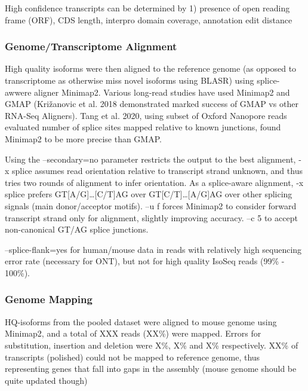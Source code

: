High confidence transcripts can be determined by 1) presence of open reading frame (ORF), CDS length, interpro domain coverage, annotation edit distance 

\subsubsection{Genome/Transcriptome Alignment} 
High quality isoforms were then aligned to the reference genome (as opposed to transcriptome as otherwise miss novel isoforms using BLASR) using splice-awwere aligner Minimap2. Various long-read studies have used Minimap2 and GMAP (Križanovic et al. 2018 demonstrated marked success of GMAP vs other RNA-Seq Aligners). Tang et al. 2020, using subset of Oxford Nanopore reads evaluated number of splice sites mapped relative to known junctions, found Minimap2 to be more precise than GMAP. 

Using the –secondary=no parameter restricts the output to the best alignment, -x splice assumes read orientation relative to transcript strand unknown, and thus tries two rounds of alignment to infer orientation. As a splice-aware alignment, -x splice prefers GT[A/G]…[C/T]AG over GT[C/T]…[A/G]AG over other splicing signals (main donor/acceptor motifs). –u f forces Minimap2 to consider forward transcript strand only for alignment, slightly improving accuracy. –c 5 to accept non-canonical GT/AG splice junctions. 

--splice-flank=yes for human/mouse data in reads with relatively high sequencing error rate (necessary for ONT), but not for high quality IsoSeq reads (99\% - 100\%). 

\subsubsection{Genome Mapping}
HQ-isoforms from the pooled dataset were aligned to mouse genome using Minimap2, and a total of XXX reads (XX\%) were mapped. Errors for substitution, insertion and deletion were X\%, X\% and X\% respectively. XX\% of transcripts (polished) could not be mapped to reference genome, thus representing genes that fall into gaps in the assembly (mouse genome should be quite updated though)


